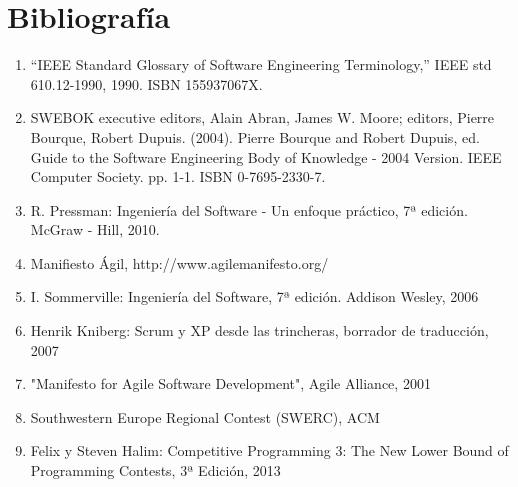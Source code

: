 \chapter{Bibliografía}
\label{biblio}

\begin{enumerate}
\item “IEEE Standard Glossary of Software Engineering Terminology,” IEEE std 610.12-1990, 1990. ISBN 155937067X.
\item SWEBOK executive editors, Alain Abran, James W. Moore; editors, Pierre Bourque, Robert Dupuis. (2004). Pierre Bourque and Robert Dupuis, ed. Guide to the Software Engineering Body of Knowledge - 2004 Version. IEEE Computer Society. pp. 1-1. ISBN 0-7695-2330-7.
\item R. Pressman: Ingeniería del Software - Un enfoque práctico, 7ª edición. McGraw - Hill, 2010.
\item Manifiesto Ágil, http://www.agilemanifesto.org/
\item I. Sommerville: Ingeniería del Software, 7ª edición. Addison Wesley, 2006
\item Henrik Kniberg: Scrum y XP desde las trincheras, borrador de traducción, 2007
\item "Manifesto for Agile Software Development", Agile Alliance, 2001
\item Southwestern Europe Regional Contest (SWERC), ACM
\item Felix y Steven Halim: Competitive Programming 3: The New Lower Bound of Programming Contests, 3ª Edición, 2013

\end{enumerate}
